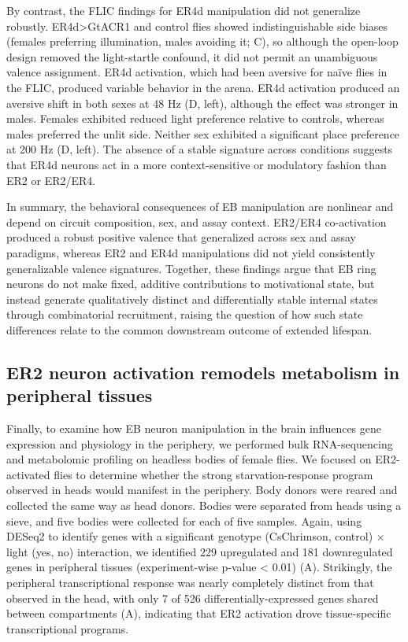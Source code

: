 By contrast, the FLIC findings for ER4d manipulation did not generalize robustly. 
ER4d>GtACR1 and control flies showed indistinguishable side biases (females preferring illumination, males avoiding it; C), so although the open-loop design removed the light-startle confound, it did not permit an unambiguous valence assignment. 
ER4d activation, which had been aversive for naïve flies in the FLIC, produced variable behavior in the arena. 
ER4d activation produced an aversive shift in both sexes at 48 Hz (D, left), although the effect was stronger in males. 
Females exhibited reduced light preference relative to controls, whereas males preferred the unlit side.
Neither sex exhibited a significant place preference at 200 Hz (D, left).
The absence of a stable signature across conditions suggests that ER4d neurons act in a more context-sensitive or modulatory fashion than ER2 or ER2/ER4.

In summary, the behavioral consequences of EB manipulation are nonlinear and depend on circuit composition, sex, and assay context. 
ER2/ER4 co-activation produced a robust positive valence that generalized across sex and assay paradigms, whereas ER2 and ER4d manipulations did not yield consistently generalizable valence signatures. 
Together, these findings argue that EB ring neurons do not make fixed, additive contributions to motivational state, but instead generate qualitatively distinct and differentially stable internal states through combinatorial recruitment, raising the question of how such state differences relate to the common downstream outcome of extended lifespan.

\subsection*{ER2 neuron activation remodels metabolism in peripheral tissues}
Finally, to examine how EB neuron manipulation in the brain influences gene expression and physiology in the periphery, we performed bulk RNA-sequencing and metabolomic profiling on headless bodies of female flies. 
We focused on ER2-activated flies to determine whether the strong starvation-response program observed in heads would manifest in the periphery. 
Body donors were reared and collected the same way as head donors. 
Bodies were separated from heads using a sieve, and five bodies were collected for each of five samples. 
Again, using DESeq2 to identify genes with a significant genotype (CsChrimson, control) $\times$ light (yes, no) interaction, we identified 229 upregulated and 181 downregulated genes in peripheral tissues (experiment-wise p-value < 0.01) (A). 
Strikingly, the peripheral transcriptional response was nearly completely distinct from that observed in the head, with only 7 of 526 differentially-expressed genes shared between compartments (A), indicating that ER2 activation drove tissue-specific transcriptional programs. 

